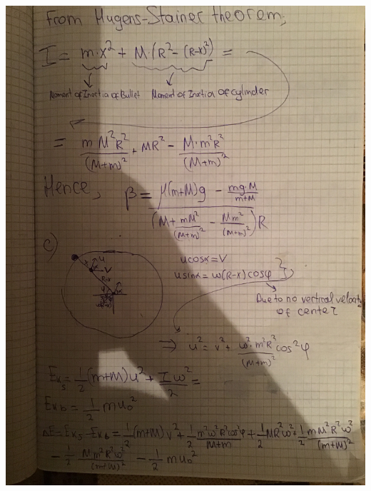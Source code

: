 \begin{sol}
\begin{center}
        \includegraphics[width=\columnwidth]{image1.jpg}
    \end{center}
\vspace{15mm}
\end{sol}